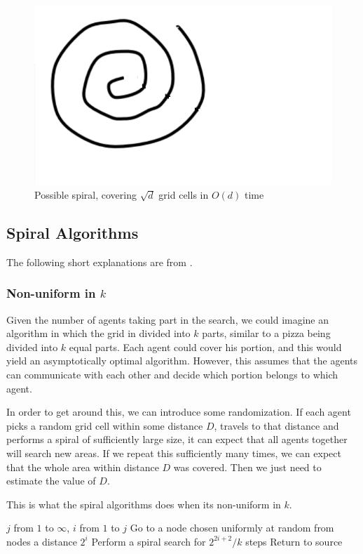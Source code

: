 \documentclass[runningheads,a4paper]{llncs}
\begin{document}
\begin{figure}
\centering
\label{fig:spiral}
\includegraphics[width=0.4\linewidth]{justspiral.pdf}
\caption{Possible spiral, covering $\sqrt{d}$ grid cells in $O(d)$ time}
\end{figure}

\subsection{Spiral Algorithms}

The following short explanations are from \cite{feinerman2012collaborative}.

\subsubsection{Non-uniform in $k$}

Given the number of agents taking part in the search, we could imagine an algorithm in which the grid in divided into $k$ parts, similar to a pizza being divided into $k$ equal parts. Each agent could cover his portion, and this would yield an asymptotically optimal algorithm. However, this assumes that the agents can communicate with each other and decide which portion belongs to which agent. 

In order to get around this, we can introduce some randomization. If each agent picks a random grid cell within some distance $D$, travels to that distance and performs a spiral of sufficiently large size, it can expect that all agents together will search new areas. If we repeat this sufficiently many times, we can expect that the whole area within distance $D$ was covered. Then we just need to estimate the value of $D$.

This is what the spiral algorithms does when its non-uniform in $k$. 

\begin{codebox}
\li \For $j$ from $1$ to $\infty$, \Then
\li \For $i$ from $1$ to $j$ \Then
\li Go to a node chosen uniformly at random from nodes a distance $2^{i}$
\li Perform a spiral search for $2^{2i+2}/k$ steps
\li Return to source \End \End 
\end{codebox}
\end{document}
